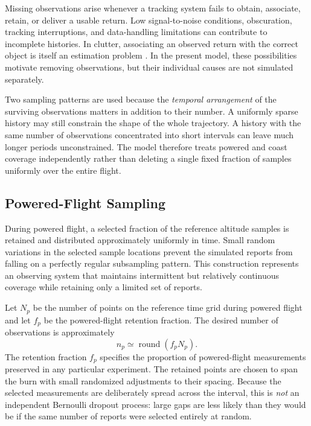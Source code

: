 Missing observations arise whenever a tracking system fails to obtain,
associate, retain, or deliver a usable return. Low signal-to-noise
conditions, obscuration, tracking interruptions, and data-handling
limitations can contribute to incomplete histories. In clutter,
associating an observed return with the correct object is itself
an estimation problem \cite{barshalom1975clutter}. In the present
model, these possibilities motivate removing observations, but
their individual causes are not simulated separately.

Two sampling patterns are used because the \emph{temporal arrangement}
of the surviving observations matters in addition to their number.
A uniformly sparse history may still constrain the shape of the
whole trajectory. A history with the same number of observations
concentrated into short intervals can leave much longer periods
unconstrained. The model therefore treats powered and coast
coverage independently rather than deleting a single fixed
fraction of samples uniformly over the entire flight.

\subsection{Powered-Flight Sampling}
\label{sec:noise-powered}

During powered flight, a selected fraction of the reference altitude
samples is retained and distributed approximately uniformly in time.
Small random variations in the selected sample locations prevent
the simulated reports from falling on a perfectly regular
subsampling pattern. This construction represents an observing
system that maintains intermittent but relatively continuous
coverage while retaining only a limited set of reports.

Let $N_p$ be the number of points on the reference time grid during
powered flight and let $f_p$ be the powered-flight retention
fraction. The desired number of observations is approximately
\begin{equation}
    n_p \simeq \operatorname{round}(f_p N_p).
    \label{eq:noise-powered-count}
\end{equation}
The retention fraction $f_p$ specifies the proportion
of powered-flight measurements preserved in any particular
experiment. The retained points are chosen to span the burn
with small randomized adjustments to their spacing.
Because the selected measurements are deliberately spread
across the interval, this is \emph{not} an independent
Bernoulli dropout process: large gaps are less likely
than they would be if the same number of reports were
selected entirely at random.

